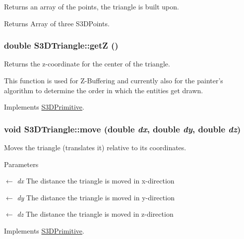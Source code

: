 Returns an array of the points, the triangle is built upon. 

\begin{DoxyReturn}{Returns}
Array of three S3DPoints. 
\end{DoxyReturn}
\hypertarget{class_s3_d_triangle_a35428b5799c8d51a6c57d1fdb5b575a1}{
\subsubsection[{getZ}]{\setlength{\rightskip}{0pt plus 5cm}double S3DTriangle::getZ ()}}
\label{class_s3_d_triangle_a35428b5799c8d51a6c57d1fdb5b575a1}


Returns the z-\/coordinate for the center of the triangle. 

This function is used for Z-\/Buffering and currently also for the painter's algorithm to determine the order in which the entities get drawn. 

Implements \hyperlink{class_s3_d_primitive_ab5b06d3a8e83216cc42554bb78afd2d9}{S3DPrimitive}.

\hypertarget{class_s3_d_triangle_a7f168122e4ed627fcb6489852a56982b}{
\subsubsection[{move}]{\setlength{\rightskip}{0pt plus 5cm}void S3DTriangle::move (double {\em dx}, \/  double {\em dy}, \/  double {\em dz})}}
\label{class_s3_d_triangle_a7f168122e4ed627fcb6489852a56982b}


Moves the triangle (translates it) relative to its coordinates. 


\begin{DoxyParams}{Parameters}
\item[\mbox{$\leftarrow$} {\em dx}]The distance the triangle is moved in x-\/direction \item[\mbox{$\leftarrow$} {\em dy}]The distance the triangle is moved in y-\/direction \item[\mbox{$\leftarrow$} {\em dz}]The distance the triangle is moved in z-\/direction \end{DoxyParams}


Implements \hyperlink{class_s3_d_primitive_a73a178ec2e1aa8e95f01baf0552724a9}{S3DPrimitive}.

